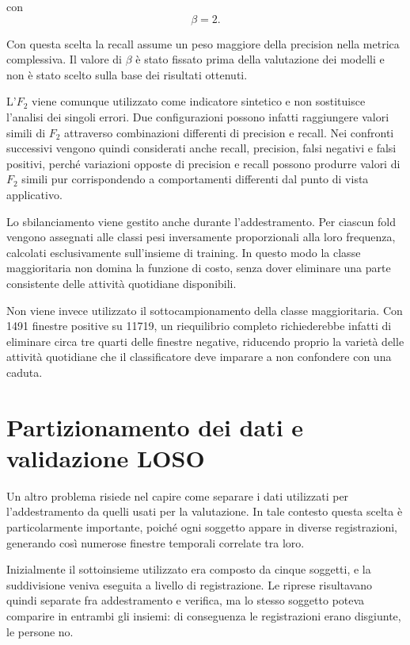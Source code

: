 con
\[
\beta=2.
\]

Con questa scelta la recall assume un peso maggiore della precision nella metrica complessiva. Il valore di $\beta$ è stato fissato prima della valutazione dei modelli e non è stato scelto sulla base dei risultati ottenuti.

L'$F_2$ viene comunque utilizzato come indicatore sintetico e non sostituisce l'analisi dei singoli errori. Due configurazioni possono infatti raggiungere valori simili di $F_2$ attraverso combinazioni differenti di precision e recall. Nei confronti successivi vengono quindi considerati anche recall, precision, falsi negativi e falsi positivi, perché variazioni opposte di precision e recall possono produrre valori di $F_2$ simili pur corrispondendo a comportamenti differenti dal punto di vista applicativo.

Lo sbilanciamento viene gestito anche durante l'addestramento. Per ciascun fold vengono assegnati alle classi pesi inversamente proporzionali alla loro frequenza, calcolati esclusivamente sull'insieme di training. In questo modo la classe maggioritaria non domina la funzione di costo, senza dover eliminare una parte consistente delle attività quotidiane disponibili.

Non viene invece utilizzato il sottocampionamento della classe maggioritaria. Con \num{1491} finestre positive su \num{11719}, un riequilibrio completo richiederebbe infatti di eliminare circa tre quarti delle finestre negative, riducendo proprio la varietà delle attività quotidiane che il classificatore deve imparare a non confondere con una caduta.

\section{Partizionamento dei dati e validazione LOSO}
\label{sec:loso}

Un altro problema risiede nel capire come separare i dati utilizzati per l'addestramento da quelli usati per la valutazione. In tale contesto questa scelta è particolarmente importante, poiché ogni soggetto appare in diverse registrazioni, generando così numerose finestre temporali correlate tra loro.

Inizialmente il sottoinsieme utilizzato era composto da cinque soggetti, e la suddivisione veniva eseguita a livello di registrazione. Le riprese risultavano quindi separate fra addestramento e verifica, ma lo stesso soggetto poteva comparire in entrambi gli insiemi: di conseguenza le registrazioni erano disgiunte, le persone no.

